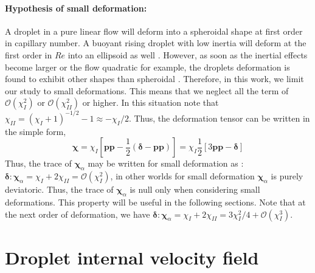     
\paragraph*{Hypothesis of small deformation: }
A droplet in a pure linear flow will deform into a spheroidal shape \citet{leal2007advanced} at first order in capillary number. 
A buoyant rising droplet with low inertia will deform at the first order in $Re$ into an ellipsoid as well \citep{taylor1964deformation}.
However, as soon as the inertial effects become larger or the flow quadratic for example, the droplets deformation is found to exhibit other shapes than spheroidal \citep{taylor1964deformation,stone1990simple}.
Therefore, in this work, we limit our study to small deformations. %
This means that we neglect all the term of $\mathcal{O}(\chi_I^2)$ or $\mathcal{O}(\chi_{II}^2)$ or higher. 
In this situation note that $\chi_{II} = (\chi_I + 1)^{-1/2} -1 \approx  - \chi_I /2$. 
Thus, the deformation tensor can be written in the simple form, 
\begin{equation}
    \bm\chi 
    = \chi_I
    \left[
        \textbf{pp} 
        - \frac{1}{2}(\bm\delta - \textbf{pp})
    \right]
    = \chi_I \frac{1}{2} \left[
        3 \textbf{pp} - \bm\delta
    \right]
    \label{eq:chi_I_small_def}
\end{equation}
Thus, the trace of $\bm\chi_\alpha$ may be written for small deformation as :  $\bm\delta:\bm\chi_\alpha  = \chi_I + 2\chi_{II} = \mathcal{O}(\chi_{I}^2)$, in other worlds for small deformation $\bm\chi_\alpha$ is purely deviatoric. 
Thus, the trace of $\bm\chi_\alpha$ is null only when considering small deformations. 
This property will be useful in the following sections.
Note that at the next order of deformation, we have $\bm\delta:\bm\chi_\alpha  = \chi_I + 2\chi_{II} = 3 \chi_I^2 /4 +  \mathcal{O}(\chi_{I}^3)$. 

\section{Droplet internal velocity field}

